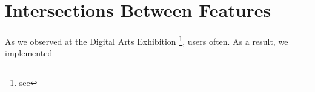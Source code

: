\section{Intersections Between
Features}\label{intersections-between-features}

As we observed at the Digital Arts Exhibition \footnote{see}, users
often. As a result, we implemented
